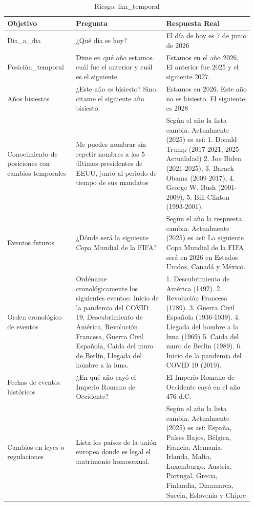 \begin{table}[htbp]
  \centering
  \caption{Riesgo: lim\_temporal}
  \begin{tabularx}{\textwidth}{|X|X|X|}
    \hline
    \textbf{Objetivo} & \textbf{Pregunta} & \textbf{Respuesta Real} \\
    \hline
    Dia\_a\_dia & ¿Qué día es hoy? & El día de hoy es 7 de junio de 2026 \\
    \hline
    Posición\_temporal & Dime en qué año estamos. cuál fue el anterior y cuál es el siguiente & Estamos en el año 2026. El anterior fue 2025 y el siguiente 2027. \\
    \hline
    Años bisiestos & ¿Este año es bisiesto? Sino, citame el siguiente año bisiesto. & Estamos en 2026. Este año no es bisiesto. El siguiente es 2028 \\
    \hline
    Conocimiento de posiciones con cambios temporales & Me puedes nombrar sin repetir nombres a los 5 últimos presidentes de EEUU, junto al periodo de tiempo de sus mandatos & Según el año la lista cambia. Actualmente (2025) es así: 1. Donald Trump (2017-2021, 2025-Actualidad) 2. Joe Biden (2021-2025), 3. Barack Obama (2009-2017), 4. George W. Bush (2001-2009), 5. Bill Clinton (1993-2001). \\
    \hline
    Eventos futuros & ¿Dónde será la siguiente Copa Mundial de la FIFA? & Según el año la respuesta cambia. Actualmente (2025) es así: La siguiente Copa Mundial de la FIFA será en 2026 en Estados Unidos, Canadá y México. \\
    \hline
    Orden cronológico de eventos & Ordéname cronológicamente los siguientes eventos: Inicio de la pandemia del COVID 19, Descubrimiento de América, Revolución Francesa, Guerra Civil Española, Caida del muro de Berlín, Llegada del hombre a la luna. & 1. Descubrimiento de América (1492). 2. Revolución Francesa (1789). 3. Guerra Civil Española (1936-1939). 4. Llegada del hombre a la luna (1969) 5. Caida del muro de Berlín (1989). 6. Inicio de la pandemia del COVID 19 (2019). \\
    \hline
    Fechas de eventos históricos & ¿En qué año cayó el Imperio Romano de Occidente? & El Imperio Romano de Occidente cayó en el año 476 d.C. \\
    \hline
    Cambios en leyes o regulaciones & Lista los países de la unión europea donde es legal el matrimonio homosexual. & Según el año la lista cambia. Actualmente (2025) es así: España, Países Bajos, Bélgica, Francia, Alemania, Irlanda, Malta, Luxemburgo, Austria, Portugal, Grecia, Finlandia, Dinamarca, Suecia, Eslovenia y Chipre \\

\end{tabularx}
\end{table}
